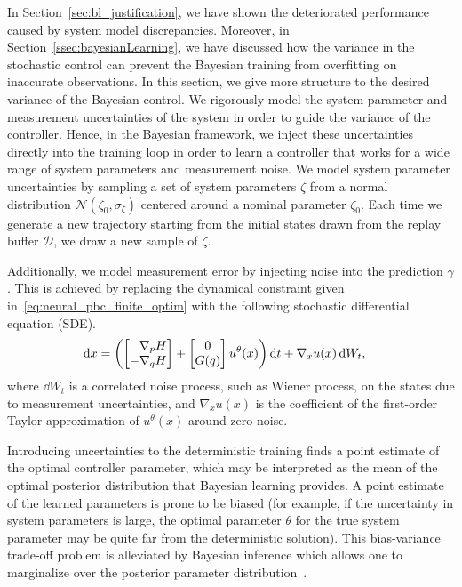 In Section~\ref{sec:bl_justification}, we have shown the deteriorated performance caused by system model discrepancies.
%
Moreover, in Section~\ref{ssec:bayesianLearning}, we have discussed how the variance in the stochastic control can prevent the Bayesian training from overfitting on inaccurate observations.
%
In this section, we give more structure to the desired variance of the Bayesian control.
%
We rigorously model the system parameter and measurement uncertainties of the system in order to guide the variance of the controller.
%
Hence, in the Bayesian framework, we inject these uncertainties directly into
the training loop in order to learn a controller that works for a wide range of
system parameters and measurement noise.
%
We model system parameter uncertainties by sampling a set of system parameters
$\zeta$ from a normal distribution $\mathcal{N}(\zeta_0, \sigma_{\zeta})$
centered around a nominal parameter $\zeta_0$.
%
Each time we generate a new trajectory starting from the initial states drawn
from the replay buffer $\mathcal{D}$, we draw a new sample of $\zeta$.
%


Additionally, we model measurement error by injecting noise into the prediction
$\gamma$.
%
This is achieved by replacing the dynamical constraint given
in~\eqref{eq:neural_pbc_finite_optim} with the following stochastic differential
equation (SDE).
\begin{align}
    \operatorname{d}\! x &= \left(\begin{bmatrix}\phantom{-}\nabla_p H \\-\nabla_q H\end{bmatrix} + \begin{bmatrix}0 \\ G(q)\end{bmatrix}u^{\theta}(x) \right) \operatorname{d}\! t + \nabla_x u(x) \operatorname{d}\! W_t, 
    \label{eq:sde_initial}
\end{align}
where $\dd W_t$ is a correlated noise process, such as Wiener process, on the
states due to measurement uncertainties, and $\nabla_x u(x)$ is the coefficient
of the first-order Taylor approximation of $u^{\theta}(x)$ around zero noise. 

\begin{rem}
    Introducing uncertainties to the deterministic training finds a point
    estimate of the optimal controller parameter, which may be interpreted
    as the mean of the optimal posterior distribution that Bayesian learning
    provides. A point estimate of the learned parameters is prone to be
    biased (for example, if the uncertainty in system parameters is large,
    the optimal parameter $\theta$ for the true system parameter may be
    quite far from the deterministic solution). This bias-variance trade-off
    problem is alleviated by Bayesian inference which allows one to
    marginalize over the posterior parameter
    distribution~\cite{bishop2006pattern}.
\end{rem}

